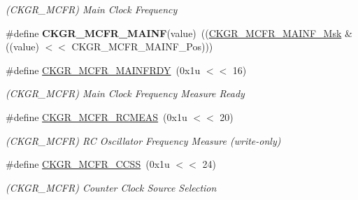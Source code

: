 \begin{DoxyCompactItemize}
\begin{DoxyCompactList}\small\item\em (C\+K\+G\+R\+\_\+\+M\+C\+FR) Main Clock Frequency \end{DoxyCompactList}\item 
\mbox{\label{group__SAMV71__PMC_ga46513b9ed18c75421164bd8037494084}} 
\#define {\bfseries C\+K\+G\+R\+\_\+\+M\+C\+F\+R\+\_\+\+M\+A\+I\+NF}(value)~((\mbox{\hyperlink{group__SAMV71__PMC_ga57b367ae43ea4e0e406c54672607eaf8}{C\+K\+G\+R\+\_\+\+M\+C\+F\+R\+\_\+\+M\+A\+I\+N\+F\+\_\+\+Msk}} \& ((value) $<$$<$ C\+K\+G\+R\+\_\+\+M\+C\+F\+R\+\_\+\+M\+A\+I\+N\+F\+\_\+\+Pos)))
\item 
\mbox{\label{group__SAMV71__PMC_ga7e1266d112bc784de35e25c613f827eb}} 
\#define \mbox{\hyperlink{group__SAMV71__PMC_ga7e1266d112bc784de35e25c613f827eb}{C\+K\+G\+R\+\_\+\+M\+C\+F\+R\+\_\+\+M\+A\+I\+N\+F\+R\+DY}}~(0x1u $<$$<$ 16)
\begin{DoxyCompactList}\small\item\em (C\+K\+G\+R\+\_\+\+M\+C\+FR) Main Clock Frequency Measure Ready \end{DoxyCompactList}\item 
\mbox{\label{group__SAMV71__PMC_ga8b91c852701958cc82ad83c6ab1930f9}} 
\#define \mbox{\hyperlink{group__SAMV71__PMC_ga8b91c852701958cc82ad83c6ab1930f9}{C\+K\+G\+R\+\_\+\+M\+C\+F\+R\+\_\+\+R\+C\+M\+E\+AS}}~(0x1u $<$$<$ 20)
\begin{DoxyCompactList}\small\item\em (C\+K\+G\+R\+\_\+\+M\+C\+FR) RC Oscillator Frequency Measure (write-\/only) \end{DoxyCompactList}\item 
\mbox{\label{group__SAMV71__PMC_ga9d97f5615199f9d8c084da0841e5292b}} 
\#define \mbox{\hyperlink{group__SAMV71__PMC_ga9d97f5615199f9d8c084da0841e5292b}{C\+K\+G\+R\+\_\+\+M\+C\+F\+R\+\_\+\+C\+C\+SS}}~(0x1u $<$$<$ 24)
\begin{DoxyCompactList}\small\item\em (C\+K\+G\+R\+\_\+\+M\+C\+FR) Counter Clock Source Selection \end{DoxyCompactList}\item 
\mbox{\label{group__SAMV71__PMC_ga6bea4fc8db6a33b79eddde5a59232816}} 

\end{DoxyCompactItemize}
